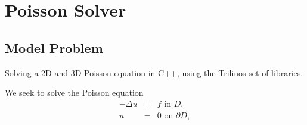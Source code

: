 \newtheorem{assumption}{Assumption}
\newtheorem{hypothesis}{Hypothesis}
\newtheorem{theorem}{Theorem}
\newtheorem{defi}{Definition}
\newtheorem{prop}{Proposition}
\newtheorem{lem}{Lemma}
\newtheorem{rem}{Remark}
\newcommand{\bx}{\mathbf{x}}
\newcommand{\by}{\mathbf{y}}
\newcommand{\bu}{\mathbf{u}}
\newcommand{\bg}{\mathbf{g}}
\newcommand{\be}{\mathbf{e}}
\newcommand{\bv}{\mathbf{v}}
\newcommand{\bz}{\mathbf{z}}
\newcommand{\buu}{\mathbf{U}}
\newcommand{\bV}{\mathbf{V}}
\newcommand{\bR}{\mathbf{R}}
\newcommand{\bff}{\mathbf{f}}
\newcommand{\bX}{\mathbf{X}}
\newcommand{\bA}{\mathbf{A}}
\newcommand{\bK}{\mathbf{K}}
\newcommand{\bI}{\mathbf{I}}
\newcommand{\bE}{\mathbf{E}}
\newcommand{\bB}{\mathbf{B}}
\newcommand{\bL}{\mathbf{L}}
\newcommand{\bb}{\mathbf{b}}
\newcommand{\bc}{\mathbf{c}}
\newcommand{\bM}{\mathbf{M}}
\newcommand{\br}{\mathbf{r}}
\newcommand{\btheta}{\boldsymbol{\theta}}
\newcommand{\bbeta}{\boldsymbol{\beta}}
\newcommand{\bzero}{\mathbf{0}}
\newcommand{\bvarphi}{\boldsymbol{\varphi}}
\newcommand{\bPhi}{\boldsymbol{\Phi}}
\newcommand{\balpha}{\boldsymbol{\alpha}}
\newcommand{\bxi}{\boldsymbol{\xi}}
\newcommand{\bgamma}{\boldsymbol{\gamma}}
\newcommand{\btau}{\boldsymbol{\tau}}
\newcommand{\bnabla}{\boldsymbol{\nabla}}
\newcommand{\uth}{u^{\btheta}}
\newcommand{\fth}{f^{\btheta}}
\newcommand{\gth}{g^{\btheta}}
\newcommand{\vth}{v^{\btheta}}
\newcommand{\wth}{w^{\btheta}}
\newcommand{\zth}{z^{\btheta}}
\newcommand{\ba}{\mathbf{a}}
\newcommand{\bw}{\mathbf{w}}
\newcommand{\etk}{\eta^k}
\newcommand{\xik}{\xi^k}
\newcommand{\bbth}{{\mathbf{b}}^{\theta_3}}
\newcommand{\xiav}{\langle \bxi \rangle}

\reversemarginpar

\section{Poisson Solver}
\subsection{Model Problem}

Solving a 2D and 3D Poisson equation in C++, using the Trilinos set of libraries.


We seek to solve the Poisson equation
\begin{eqnarray}
-\Delta u &=& f \mbox{ in } D,\label{eq:1}\\[1ex]
%
u &=& 0 \mbox{ on } \partial D,\label{eq:2}
\end{eqnarray}

